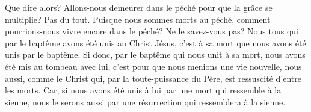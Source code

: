 Que dire alors?
	Allons-nous demeurer dans le péché pour que la grâce se multiplie?
	Pas du tout.
Puisque nous sommes morts au péché,
	comment pourrions-nous vivre encore dans le péché?
Ne le savez-vous pas?
	Nous tous qui par le baptême avons été unis au Christ Jésus,
	c’est à sa mort que nous avons été unis par le baptême.
Si donc, par le baptême qui nous unit à sa mort,
		nous avons été mis au tombeau avec lui,
	c’est pour que nous menions une vie nouvelle, nous aussi,
	comme le Christ qui, par la toute-puissance du Père,
		est ressuscité d’entre les morts.
Car, si nous avons été unis à lui par une mort qui ressemble à la sienne,
	nous le serons aussi par une résurrection qui ressemblera à la sienne.
